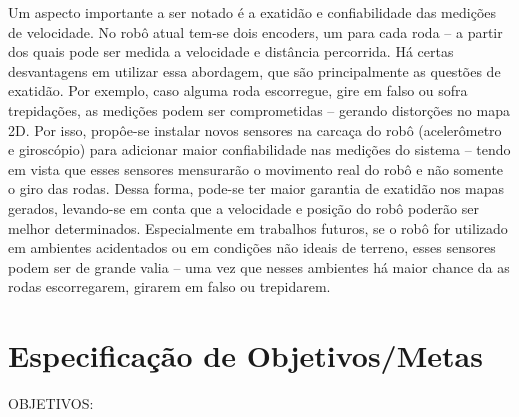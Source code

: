 Um aspecto importante a ser notado é a exatidão e confiabilidade das medições de velocidade. No robô atual tem-se dois encoders, um para cada roda – a partir dos quais pode ser medida a velocidade e distância percorrida. Há certas desvantagens em utilizar essa abordagem, que são principalmente as questões de exatidão. Por exemplo, caso alguma roda escorregue, gire em falso ou sofra trepidações, as medições podem ser comprometidas – gerando distorções no mapa 2D. Por isso, propôe-se instalar novos sensores na carcaça do robô (acelerômetro e giroscópio) para adicionar maior confiabilidade nas medições do sistema – tendo em vista que esses sensores mensurarão o movimento real do robô e não somente o giro das rodas. Dessa forma, pode-se ter maior garantia de exatidão nos mapas gerados, levando-se em conta que a velocidade e posição do robô poderão ser melhor determinados. Especialmente em trabalhos futuros, se o robô for utilizado em ambientes acidentados ou em condições não ideais de terreno, esses sensores podem ser de grande valia – uma vez que nesses ambientes há maior chance da as rodas escorregarem, girarem em falso ou trepidarem.

\chapter{Especificação de Objetivos/Metas}
OBJETIVOS:

